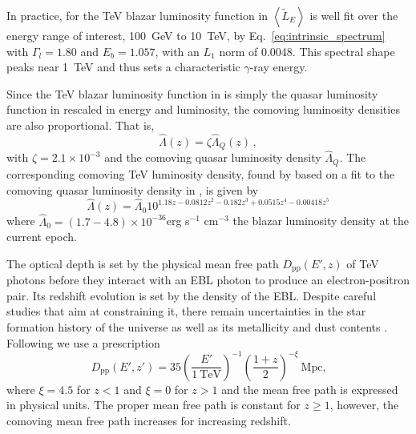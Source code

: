 \documentclass[numberedappendix]{emulateapj}
\newcommand\ALc[1]{{\color{red} \bf #1}} %
\begin{document}
In practice, for the TeV blazar luminosity function in
\citet{2014ApJ...790..137B} $\left< \tilde{L}_E \right>$ is well fit
over the energy range of interest, 100~GeV to 10~TeV, by
Eq.~\eqref{eq:intrinsic_spectrum} with $\Gamma_l=1.80$ and $E_b=1.057$,
with an $L_1$ norm of 0.0048.  This spectral shape peaks near 1~TeV
and thus sets a characteristic $\gamma$-ray energy.

Since the TeV blazar luminosity function in
\citet{2014ApJ...790..137B} is simply the quasar luminosity function
in \citet{2007ApJ...654..731H} rescaled in energy and luminosity, the
comoving luminosity densities are also proportional.  That is,
\begin{equation}
\hat{\Lambda}(z) = \zeta \hat{\Lambda}_Q(z)\,,
\end{equation}
with $\zeta=2.1\times 10^{-3}$ and the comoving quasar luminosity
density $\hat{\Lambda}_Q$. The corresponding comoving TeV luminosity
density, found by \citet{2012ApJ...752...23C} based on a fit to the
comoving quasar luminosity density in \citet{2007ApJ...654..731H}, is
given by
\begin{equation}
\label{eq:phi_quasar}
\hat{\Lambda}(z)=\hat{\Lambda}_0 10^{1.18 z - 0.0812 z^2 - 0.182 z^3 + 0.0515 z^4 - 0.00418 z^5} 
\end{equation}
where 
$\hat{\Lambda}_0=(1.7-4.8)\times 10^{-36}$erg s$^{-1}$ cm$^{-3}$ the
blazar luminosity density at the current epoch. 



The optical depth is set by the physical mean free path $D_\mathrm{pp}(E',z)$ of TeV photons before they interact with an EBL photon to produce an electron-positron pair. Its redshift evolution is set by the density of the EBL. Despite careful studies that aim at constraining it, there remain uncertainties in the star formation history of the universe as well as its metallicity and dust contents \citep[see, e.g.][]{2008A&A...487..837F,2006ApJ...648..774S}. Following \citet{2012ApJ...752...23C} we use a prescription
\begin{equation}
\label{eq:mean_free_path}
D_{\mathrm{pp}}(E',z')=35\left(\frac{E'}{1~\textrm{TeV}}\right)^{-1} \left(\frac{1+z}{2}\right)^{-\xi}~\textrm{Mpc,}
\end{equation}
where $\xi=4.5$ for $z<1$ and $\xi=0$ for $z>1$ \citep{2004A&A...413..807K,2009PhRvD..80l3012N} and the mean free path is expressed in physical units. The proper mean free path is constant for $z\geq 1$, however, the comoving mean free path increases for increasing redshift.
\end{document}
